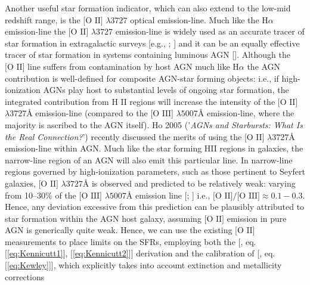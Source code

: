 Another useful star formation indicator, which can also extend to the low-mid redshift range, is the $\text{[O II]}$ $\lambda{3727}$ optical emission-line. Much like the $\text{H}\alpha$ emission-line the $\text{[O II]}$ $\lambda{3727}$ emission-line is widely used as an accurate tracer of star formation in extragalactic surveys [e.g., \cite{Lilly_1996}; \cite{Hippelein_2003}] and it can be an equally effective tracer of star formation in systems containing luminous AGN [\cite{2006ApJ...642..702K}]. Although the $\text{[O II]}$ line suffers from contamination by host AGN much like $\text{H}\alpha$ the AGN contribution is well-defined for composite AGN-star forming objects: i.e., if high-ionization AGNs play host to substantial levels of ongoing star formation, the integrated contribution from $\text{H II}$ regions will increase the intensity of the $\text{[O II]}$ $\lambda3727$Å  emission-line (compared to the $\text{[O III]}$ $\lambda5007$Å emission-line, where the majority is ascribed to the AGN itself). Ho 2005 ('\textit{AGNs and Starbursts: What Is the Real Connection?}') recently discussed the merits of using the $\text{[O II]}$ $\lambda{3727}$Å emission-line within AGN. Much like the star forming HII regions in galaxies, the narrow-line region of an AGN will also emit this particular line. In narrow-line regions governed by high-ionization parameters, such as those pertinent to Seyfert galaxies, $\text{[O II]}$ $\lambda{3727}$Å is observed and predicted to be relatively weak: varying from 10--30\% of the $\text{[O III]}$ $\lambda{5007}$Å emission line [\cite{Ferland_1986}; \cite{Ho_1993}] i.e., $\text{[O II]/[O III]}\approx{0.1-0.3}$. Hence, any deviation excessive from this prediction can be plausibly attributed to star formation within the AGN host galaxy, assuming $\text{[O II]}$ emission in pure AGN is generically quite weak. Hence, we can use the existing $\text{[O II]}$ measurements to place limits on the SFRs, employing both the [\cite{Kennicutt_1998}, eq. [\ref{eq:Kennicutt1}], [\ref{eq:Kennicutt2}]] derivation and the calibration of [\cite{Kewley_2004}, eq. [\ref{eq:Kewley}]], which explicitly takes into account extinction and metallicity corrections
